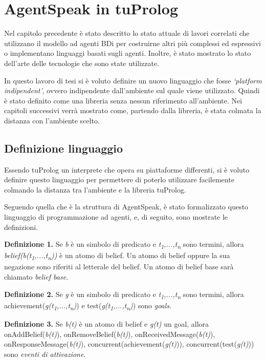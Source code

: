 \chapter{AgentSpeak in tuProlog}
Nel capitolo precedente \`e stato descritto lo stato attuale di lavori correlati che utilizzano il modello ad agenti BDi per costruirne altri pi\`u complessi ed espressivi o implementano linguaggi basati sugli agenti. Inoltre, \`e stato mostrato lo stato dell'arte delle tecnologie che sono state utilizzate.

In questo lavoro di tesi si \`e voluto definire un nuovo linguaggio che fosse \textit{`platform indipendent'}, ovvero indipendente dall'ambiente sul quale viene utilizzato. Quindi \`e stato definito come una libreria senza nessun riferimento all'ambiente. Nei capitoli successivi verr\`a mostrato come, partendo dalla libreria, \`e stata colmata la distanza con l'ambiente scelto.

\section{Definizione linguaggio}
Essendo tuProlog un interprete che opera su piattaforme differenti, si \`e voluto definire questo linguaggio per permettere di poterlo utilizzare facilemente colmando la distanza tra l'ambiente e la libreria tuProlog.

Seguendo quella che \`e la struttura di AgentSpeak, \`e stato formalizzato questo linguaggio di programmazione ad agenti, e, di seguito, sono mostrate le definizioni.


\smallskip
\textbf{Definizione 1.} Se \textit{b} \`e un simbolo di predicato e \textit{t\textsubscript{1},...,t\textsubscript{n}} sono termini, allora \textit{belief(b(t\textsubscript{1},...,t\textsubscript{n}))} \`e un atomo di belief.
Un atomo di belief oppure la sua negazione sono riferiti al letterale del belief. Un atomo di belief base sar\`a chiamato \textit{belief base}.

\smallskip
\textbf{Definizione 2.} Se \textit{g} \`e un simbolo di predicato e \textit{t\textsubscript{1},...,t\textsubscript{n}} sono termini, allora achievement(\textit{g(t\textsubscript{1},...,t\textsubscript{n})}) e test(\textit{g(t\textsubscript{1},...,t\textsubscript{n})}) sono \textit{goals}.

\smallskip
\textbf{Definizione 3.} Se \textit{b(t)} \`e un atomo di belief e \textit{g(t)} un goal, allora onAddBelief(\textit{b(t)}), onRemoveBelief(\textit{b(t)}), onReceivedMessage(\textit{b(t)}), onResponseMessage(\textit{b(t)}), concurrent(achievement(\textit{g(t)})), concurrent(test(\textit{g(t)})) sono \textit{eventi di attivazione}.

